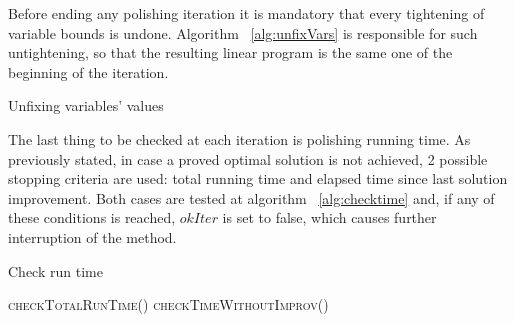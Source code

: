 Before ending any polishing iteration it is mandatory that every tightening of variable bounds is undone. Algorithm ~\ref{alg:unfixVars} is responsible for such untightening, so that the resulting linear program is the same one of the beginning of the iteration.

\begin{algorithm}[H]
  \caption{Unfixing variables' values
    \label{alg:unfixVars}}
  \begin{algorithmic}[1]
			\EndFor
    \EndProcedure	
  \end{algorithmic}	
\end{algorithm}

The last thing to be checked at each iteration is polishing running time. As previously stated, in case a proved optimal solution is not achieved, 2 possible stopping criteria are used: total running time and elapsed time since last solution improvement. Both cases are tested at algorithm ~\ref{alg:checktime} and, if any of these conditions is reached, $okIter$ is set to false, which causes further interruption of the method.

\begin{algorithm}[H]
  \caption{Check run time
    \label{alg:checktime}}
  \begin{algorithmic}[1]
			\State \textsc{checkTotalRunTime}()
			\State \textsc{checkTimeWithoutImprov}()
    \EndProcedure		
		\Statex
			\EndIf
    \EndProcedure	
		\Statex
				\EndIf
			\EndIf		
		\EndProcedure	
  \end{algorithmic}	
\end{algorithm}





